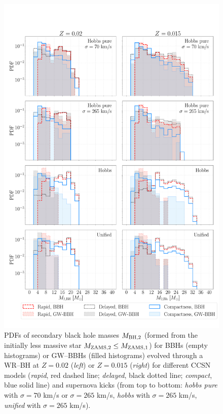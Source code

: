 \documentclass[a4paper,titlepage]{book}     	%
\begin{document}
\begin{appendices}
\begin{figure}
	\centering
	\includegraphics[width=\textwidth]{./images/remM2.pdf}	
	\caption{PDFs of secondary black hole masses $M_{\rm BH,2}$ (formed from the initially less massive star $M_{\rm ZAMS, 2} \leq M_{\rm ZAMS, 1}$) for BBHs (empty histograms) or GW--BBHs (filled histograms) evolved through a WR--BH at $Z=0.02$ (\emph{left}) or $Z=0.015$ (\emph{right}) for different CCSN models (\emph{rapid}, red dashed line; \emph{delayed}, black dotted line; \emph{compact}, blue solid line) and supernova kicks (from top to bottom: \emph{hobbs pure} with $\sigma = 70$ km/s or $\sigma = 265$ km/s, \emph{hobbs} with $\sigma = 265$ km/s, \emph{unified} with $\sigma = 265$ km/s).}\label{fig:resultsMBH2rem}
\end{figure}


\end{appendices}
\end{document}
